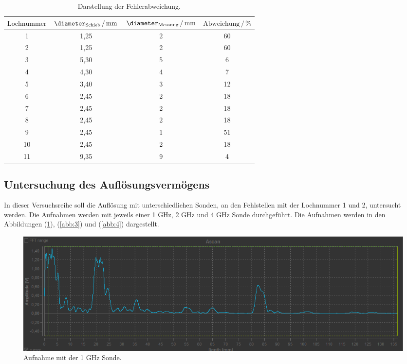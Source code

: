\begin{table}[H]
  \centering
  \caption{Darstellung der Fehlerabweichung.}
  \label{tab:4}
  \begin{tabular}{c c c  c}
    \toprule
     $\text{Lochnummer}$ &
     $\diameter_{\text{Schieb}} \,/\, \si[per-mode=fraction]{\milli\meter}$ &
     $\diameter_{\text{Messung}} \,/\, \si[per-mode=fraction]{\milli\meter}$ &
     $\text{Abweichung} \,/\, \%$ \\
     \midrule
     1 & 1,25 & 2 &  60 \\
     2 & 1,25 & 2 &  60 \\
     3 & 5,30 & 5 &  6 \\
     4 & 4,30 & 4 &  7 \\
     5 & 3,40 & 3 &  12 \\
     6 & 2,45 & 2 &  18 \\
     7 & 2,45 & 2 &  18 \\
     8 & 2,45 & 2 &  18 \\
     9 & 2,45 & 1 &  51 \\
     10 & 2,45 & 2 & 18\\
     11 & 9,35  & 9 & 4 \\
     \bottomrule
  \end{tabular}
\end{table}

\subsection{Untersuchung des Auflösungsvermögens}
In dieser Versuchsreihe soll die Auflösung mit unterschiedlichen Sonden, an den Fehlstellen mit
der Lochnummer 1 und 2, untersucht werden.
Die Aufnahmen werden mit jeweils einer 1 GHz, 2 GHz und 4 GHz Sonde durchgeführt. Die Aufnahmen werden
in den Abbildungen (\ref{abb:2}), (\ref{abb:3}) und (\ref{abb:4}) dargestellt.

\begin{figure}[H]
  \centering
  \includegraphics[width=\textwidth]{content/1MHz.png}
  \caption{Aufnahme mit der 1 GHz Sonde.}
  \label{abb:2}
\end{figure}

